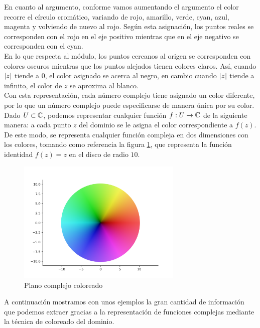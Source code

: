 En cuanto al argumento, conforme vamos aumentando el argumento el color recorre el círculo cromático, variando de rojo, amarillo, verde, cyan, azul, magenta y volviendo de nuevo al rojo. Según esta asignación, los puntos reales se corresponden con el rojo en el eje positivo mientras que en el eje negativo se corresponden con el cyan. \\

En lo que respecta al módulo, los puntos cercanos al origen se corresponden con colores oscuros mientras que los puntos alejados tienen colores claros. Así, cuando $\left\lvert z\right\rvert$ tiende a $0$, el color asignado se acerca al negro, en cambio cuando $\left\lvert z\right\rvert$ tiende a infinito, el color de $z$ se aproxima al blanco. \\

Con esta representación, cada número complejo tiene asignado un color diferente, por lo que un número complejo puede especificarse de manera única por su color. Dado $U \subset \mathbb{C}$, podemos representar cualquier función $f: U \to \mathbb{C}$ de la siguiente manera: a cada punto $z$ del dominio se le asigna el color correspondiente a $f(z)$. De este modo, se representa cualquier función compleja en dos dimensiones con los colores, tomando como referencia la figura \ref{fig:z}, que representa la función identidad $f(z) = z$ en el disco de radio $10$. \\

\begin{figure}[!htbp]
    \centering
    \includegraphics[width=0.7\textwidth]{../Aplicacion/z.png}
    \caption{Plano complejo coloreado}
    \label{fig:z}
\end{figure}

A continuación mostramos con unos ejemplos la gran cantidad de información que podemos extraer gracias a la representación de funciones complejas mediante la técnica de coloreado del dominio. \\

